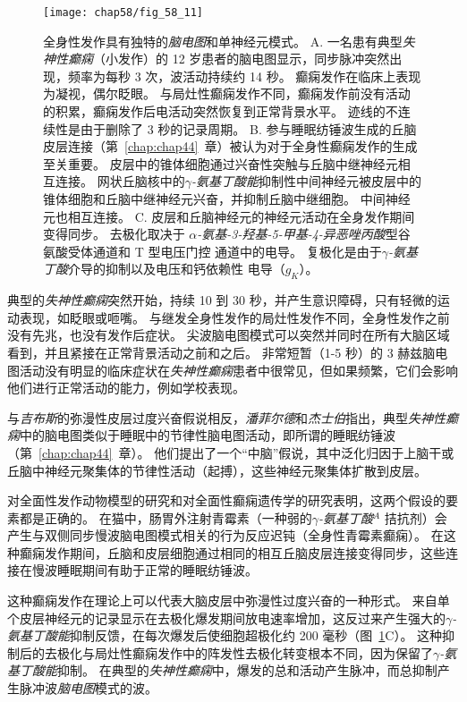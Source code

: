 \begin{figure}[htbp]
	\centering
	\texttt{[image: chap58/fig\_58\_11]}
	\caption{全身性发作具有独特的\textit{脑电图}和单神经元模式。
		A. 一名患有典型\textit{失神性癫痫}（小发作）的 12 岁患者的脑电图显示，同步脉冲突然出现，频率为每秒 3 次，波活动持续约 14 秒。
		癫痫发作在临床上表现为凝视，偶尔眨眼。
		与局灶性癫痫发作不同，癫痫发作前没有活动的积累，癫痫发作后电活动突然恢复到正常背景水平。
		迹线的不连续性是由于删除了 3 秒的记录周期\cite{lothman1990seizures}。
		B. 参与睡眠纺锤波生成的丘脑皮层连接（第~\ref{chap:chap44}~章）被认为对于全身性癫痫发作的生成至关重要。
		皮层中的锥体细胞通过兴奋性突触与丘脑中继神经元相互连接。
		网状丘脑核中的\textit{$\gamma$-氨基丁酸能}抑制性中间神经元被皮层中的锥体细胞和丘脑中继神经元兴奋，并抑制丘脑中继细胞。
		中间神经元也相互连接。 
		C. 皮层和丘脑神经元的神经元活动在全身发作期间变得同步。
		去极化取决于 \textit{$\alpha$-氨基-3-羟基-5-甲基-4-异恶唑丙酸}型谷氨酸受体通道和 T 型电压门控  通道中的电导。
		复极化是由于\textit{$\gamma$-氨基丁酸}介导的抑制以及电压和钙依赖性  电导（$ g_K $）\cite{lothman1993neurobiology}。}
	\label{fig:58_11}
\end{figure}


典型的\textit{失神性癫痫}突然开始，持续 10 到 30 秒，并产生意识障碍，只有轻微的运动表现，如眨眼或咂嘴。
与继发全身性发作的局灶性发作不同，全身性发作之前没有先兆，也没有发作后症状。
尖波脑电图模式可以突然并同时在所有大脑区域看到，并且紧接在正常背景活动之前和之后。
非常短暂（1-5 秒）的 3 赫兹脑电图活动没有明显的临床症状在\textit{失神性癫痫}患者中很常见，但如果频繁，它们会影响他们进行正常活动的能力，例如学校表现。


与\textit{吉布斯}的弥漫性皮层过度兴奋假说相反，\textit{潘菲尔德}和\textit{杰士伯}指出，典型\textit{失神性癫痫}中的脑电图类似于睡眠中的节律性脑电图活动，即所谓的睡眠纺锤波（第~\ref{chap:chap44}~章）。
他们提出了一个“中脑”假说，其中泛化归因于上脑干或丘脑中神经元聚集体的节律性活动（起搏），这些神经元聚集体扩散到皮层。


对全面性发作动物模型的研究和对全面性癫痫遗传学的研究表明，这两个假设的要素都是正确的。
在猫中，肠胃外注射青霉素（一种弱的\textit{$\gamma$-氨基丁酸}$^A$ 拮抗剂）会产生与双侧同步慢波脑电图模式相关的行为反应迟钝（全身性青霉素癫痫）。
在这种癫痫发作期间，丘脑和皮层细胞通过相同的相互丘脑皮层连接变得同步，这些连接在慢波睡眠期间有助于正常的睡眠纺锤波。


这种癫痫发作在理论上可以代表大脑皮层中弥漫性过度兴奋的一种形式。
来自单个皮层神经元的记录显示在去极化爆发期间放电速率增加，这反过来产生强大的\textit{$\gamma$-氨基丁酸能}抑制反馈，在每次爆发后使细胞超极化约 200 毫秒（图~\ref{fig:58_11}C）。
这种抑制后的去极化与局灶性癫痫发作中的阵发性去极化转变根本不同，因为保留了\textit{$\gamma$-氨基丁酸能}抑制。
在典型的\textit{失神性癫痫}中，爆发的总和活动产生脉冲，而总抑制产生脉冲波\textit{脑电图}模式的波。


